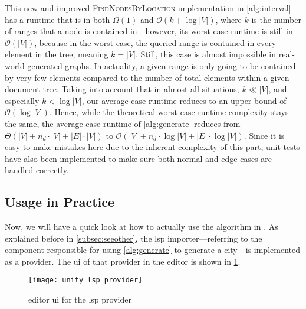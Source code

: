 \documentclass[../thesis]{subfiles}
\begin{document}
This new and improved \textsc{FindNodesByLocation} implementation in \cref{alg:interval} has a runtime that is in both $\Omega(1)$ and $\mathcal{O}(k + \log |V|)$, where $k$ is the number of \glspl{range} that a node is contained in---however, its worst-case runtime is still in $\mathcal{O}(|V|)$, because in the worst case, the queried range is contained in every element in the tree, meaning $k = |V|$.
Still, this case is almost impossible in real-world generated graphs.
In actuality, a given range is only going to be contained by very few elements compared to the number of total elements within a given document tree.
Taking into account that in almost all situations, $k \ll |V|$, and especially $k < \log |V|$, our average-case runtime reduces to an upper bound of $\mathcal{O}(\log |V|)$.
Hence, while the theoretical worst-case runtime complexity stays the same, the average-case runtime of \cref{alg:generate} reduces from $\Theta(|V| + n_d \cdot |V| + |E| \cdot |V|)$ to $\mathcal{O}(|V| + n_d \cdot \log |V| + |E| \cdot \log |V|)$.
Since it is easy to make mistakes here due to the inherent complexity of this part, unit tests have also been implemented to make sure both normal and edge cases are handled correctly.

\subsection{Usage in Practice}\label{subsec:alg_editor}
Now, we will have a quick look at how to actually use the algorithm in \SEE{}.
As explained before in \cref{subsec:seeother}, the \gls{lsp} importer---referring to the component responsible for using \cref{alg:generate} to generate a \gls{city}---is implemented as a \gls{provider}.
The \gls{ui} of that \gls{provider} in the \gls{editor} is shown in \cref{fig:unity_lsp_provider}.

\begin{figure}
	\begin{center}
		\texttt{[image: unity\_lsp\_provider]}
	\end{center}
	\caption{\gls{editor} \gls{ui} for the \gls{lsp} \gls{provider}}\label{fig:unity_lsp_provider}
\end{figure}
\end{document}
